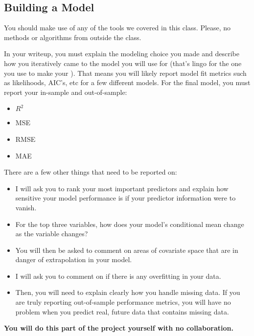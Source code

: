 \documentclass[12pt]{article}
\begin{document}
\subsection{Building a Model}

You should make use of any of the tools we covered in this class. Please, no methods or algorithms from outside the class.

In your writeup, you must explain the modeling choice you made and describe how you iteratively came to the model you will use for  (that's lingo for the one you use to make your ). That means you will likely report model fit metrics such as likelihoods, AIC's, etc for a few different models. For the final model, you must report your in-sample and out-of-sample: 

\begin{itemize}
\item $R^2$ 
\item MSE 
\item RMSE
\item MAE
\end{itemize}

There are a few other things that need to be reported on:


\begin{itemize}
\item I will ask you to rank your most important predictors and explain how sensitive your model performance is if your predictor information were to vanish.

\item For the top three variables, how does your model's conditional mean change as the variable changes?

\item You will then be asked to comment on areas of covariate space that are in danger of extrapolation in your model.

\item I will ask you to comment on if there is any overfitting in your data.

\item Then, you will need to explain clearly how you handle missing data. If you are truly reporting out-of-sample performance metrics, you will have no problem when you predict real, future data that contains missing data.
\end{itemize}

\textbf{You will do this part of the project yourself with no collaboration.}
\end{document}
